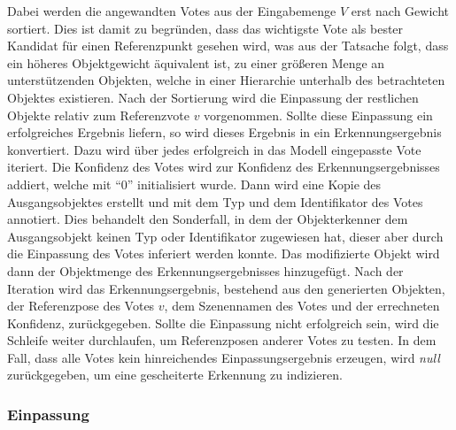 Dabei werden die angewandten Votes aus der Eingabemenge $V$ erst nach Gewicht sortiert.
Dies ist damit zu begründen, dass das wichtigste Vote als bester Kandidat für einen Referenzpunkt gesehen wird, was aus der Tatsache folgt, dass ein höheres Objektgewicht äquivalent ist, zu einer größeren Menge an unterstützenden Objekten, welche in einer Hierarchie unterhalb des betrachteten Objektes existieren.
Nach der Sortierung wird die Einpassung der restlichen Objekte relativ zum Referenzvote $v$ vorgenommen.
Sollte diese Einpassung ein erfolgreiches Ergebnis liefern, so wird dieses Ergebnis in ein Erkennungsergebnis konvertiert.
Dazu wird über jedes erfolgreich in das Modell eingepasste Vote iteriert.
Die Konfidenz des Votes wird zur Konfidenz des Erkennungsergebnisses addiert, welche mit "`0"' initialisiert wurde.
Dann wird eine Kopie des Ausgangsobjektes erstellt und mit dem Typ und dem Identifikator des Votes annotiert.
Dies behandelt den Sonderfall, in dem der Objekterkenner dem Ausgangsobjekt keinen Typ oder Identifikator zugewiesen hat, dieser aber durch die Einpassung des Votes inferiert werden konnte.
Das modifizierte Objekt wird dann der Objektmenge des Erkennungsergebnisses hinzugefügt.
Nach der Iteration wird das Erkennungsergebnis, bestehend aus den generierten Objekten, der Referenzpose des Votes $v$, dem Szenennamen des Votes und der errechneten Konfidenz, zurückgegeben.
Sollte die Einpassung nicht erfolgreich sein, wird die Schleife weiter durchlaufen, um Referenzposen anderer Votes zu testen.
In dem Fall, dass alle Votes kein hinreichendes Einpassungsergebnis erzeugen, wird \textit{null} zurückgegeben, um eine gescheiterte Erkennung zu indizieren.

\subsubsection{Einpassung}

